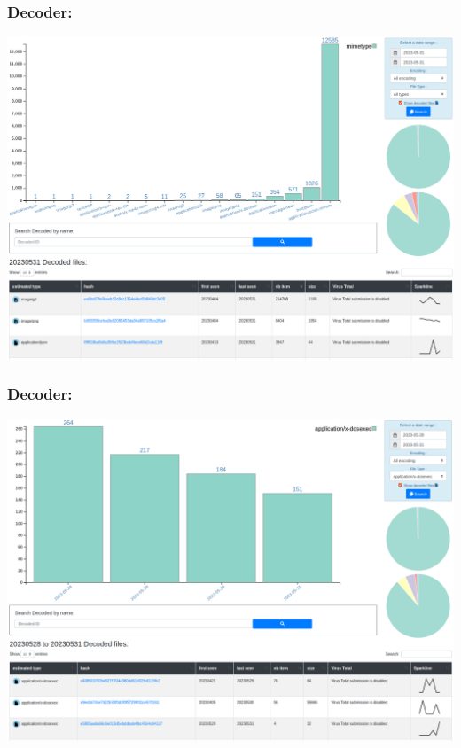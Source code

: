 \documentclass[aspectratio=169]{beamer}
\begin{document}
\begin{frame}
    \frametitle{Decoder:}
    \centerline{
        \includegraphics[scale=0.23]{screenshot/decodeds_dashboard.png}
    }
\end{frame}

\begin{frame}
    \frametitle{Decoder:}
    \centerline{
        \includegraphics[scale=0.23]{screenshot/decodeds_dos.png}
    }
\end{frame}
\end{document}
